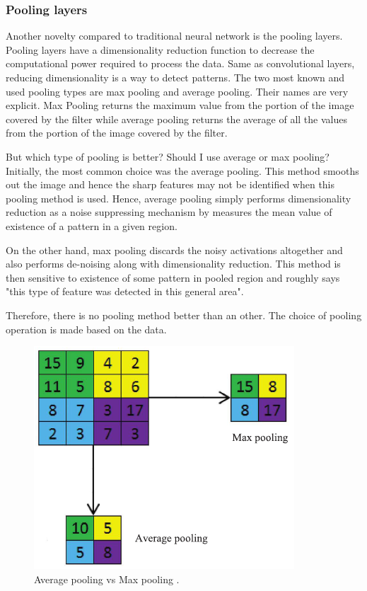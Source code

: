\documentclass[11pt, openany]{report}
\theoremstyle{plain}
\theoremstyle{definition}
\theoremstyle{remark}
\begin{document}
\subsubsection{Pooling layers} \label{sec:pooling-layers}
Another novelty compared to traditional neural network is the pooling layers. Pooling layers have a dimensionality reduction function to decrease the computational power required to process the data. Same as convolutional layers, reducing dimensionality is a way to detect patterns. The two most known and used pooling types are max pooling and average pooling. Their names are very explicit. Max Pooling returns the maximum value from the portion of the image covered by the filter while average pooling returns the average of all the values from the portion of the image covered by the filter. 

But which type of pooling is better? Should I use average or max pooling? Initially, the most common choice was the average pooling. This method smooths out the image and hence the sharp features may not be identified when this pooling method is used. Hence, average pooling simply performs dimensionality reduction as a noise suppressing mechanism by measures the mean value of existence of a pattern in a given region. 

On the other hand, max pooling discards the noisy activations altogether and also performs de-noising along with dimensionality reduction. This method is then sensitive to existence of some pattern in pooled region and roughly says "this type of feature was detected in this general area".

Therefore, there is no pooling method better than an other. The choice of pooling operation is made based on the data.  

\begin{figure}[h]
  \centering
  \includegraphics[scale=0.7]{figures/averageVSmaxPOOLING.png}
  \caption{Average pooling vs Max pooling \citep{CNN-1}.}
  \label{fig:avgVSmaxPOOLING}
\end{figure}
\end{document}
